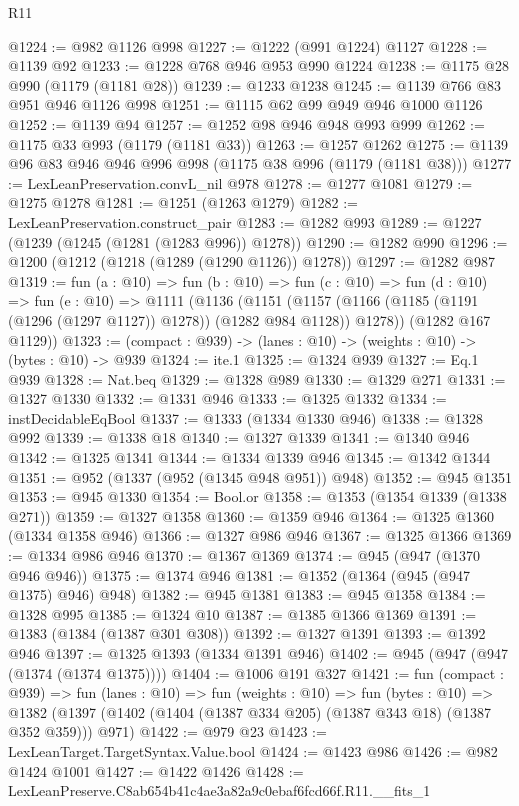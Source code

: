 \begin{lexlean}{R11}
\begin{coremodule}
@1224 := @982 @1126 @998
@1227 := @1222 (@991 @1224) @1127
@1228 := @1139 @92
@1233 := @1228 @768 @946 @953 @990 @1224
@1238 := @1175 @28 @990 (@1179 (@1181 @28))
@1239 := @1233 @1238
@1245 := @1139 @766 @83 @951 @946 @1126 @998
@1251 := @1115 @62 @99 @949 @946 @1000 @1126
@1252 := @1139 @94
@1257 := @1252 @98 @946 @948 @993 @999
@1262 := @1175 @33 @993 (@1179 (@1181 @33))
@1263 := @1257 @1262
@1275 := @1139 @96 @83 @946 @946 @996 @998 (@1175 @38 @996 (@1179 (@1181 @38)))
@1277 := LexLeanPreservation.convL_nil @978
@1278 := @1277 @1081
@1279 := @1275 @1278
@1281 := @1251 (@1263 @1279)
@1282 := LexLeanPreservation.construct_pair
@1283 := @1282 @993
@1289 := @1227 (@1239 (@1245 (@1281 (@1283 @996)) @1278))
@1290 := @1282 @990
@1296 := @1200 (@1212 (@1218 (@1289 (@1290 @1126)) @1278))
@1297 := @1282 @987
@1319 := fun (a : @10) =>
  fun (b : @10) =>
  fun (c : @10) =>
  fun (d : @10) =>
  fun (e : @10) =>
  @1111
    (@1136
      (@1151 (@1157 (@1166 (@1185 (@1191 (@1296 (@1297 @1127)) @1278)) (@1282 @984 @1128)) @1278))
      (@1282 @167 @1129))
@1323 := (compact : @939) -> (lanes : @10) -> (weights : @10) -> (bytes : @10) -> @939
@1324 := ite.{1}
@1325 := @1324 @939
@1327 := Eq.{1} @939
@1328 := Nat.beq
@1329 := @1328 @989
@1330 := @1329 @271
@1331 := @1327 @1330
@1332 := @1331 @946
@1333 := @1325 @1332
@1334 := instDecidableEqBool
@1337 := @1333 (@1334 @1330 @946)
@1338 := @1328 @992
@1339 := @1338 @18
@1340 := @1327 @1339
@1341 := @1340 @946
@1342 := @1325 @1341
@1344 := @1334 @1339 @946
@1345 := @1342 @1344
@1351 := @952 (@1337 (@952 (@1345 @948 @951)) @948)
@1352 := @945 @1351
@1353 := @945 @1330
@1354 := Bool.or
@1358 := @1353 (@1354 @1339 (@1338 @271))
@1359 := @1327 @1358
@1360 := @1359 @946
@1364 := @1325 @1360 (@1334 @1358 @946)
@1366 := @1327 @986 @946
@1367 := @1325 @1366
@1369 := @1334 @986 @946
@1370 := @1367 @1369
@1374 := @945 (@947 (@1370 @946 @946))
@1375 := @1374 @946
@1381 := @1352 (@1364 (@945 (@947 @1375) @946) @948)
@1382 := @945 @1381
@1383 := @945 @1358
@1384 := @1328 @995
@1385 := @1324 @10
@1387 := @1385 @1366 @1369
@1391 := @1383 (@1384 (@1387 @301 @308))
@1392 := @1327 @1391
@1393 := @1392 @946
@1397 := @1325 @1393 (@1334 @1391 @946)
@1402 := @945 (@947 (@947 (@1374 (@1374 @1375))))
@1404 := @1006 @191 @327
@1421 := fun (compact : @939) =>
  fun (lanes : @10) =>
  fun (weights : @10) =>
  fun (bytes : @10) =>
  @1382 (@1397 (@1402 (@1404 (@1387 @334 @205) (@1387 @343 @18) (@1387 @352 @359))) @971)
@1422 := @979 @23
@1423 := LexLeanTarget.TargetSyntax.Value.bool
@1424 := @1423 @986
@1426 := @982 @1424 @1001
@1427 := @1422 @1426
@1428 := LexLeanPreserve.C8ab654b41c4ae3a82a9c0ebaf6fcd66f.R11.__fits_1

\end{coremodule}
\end{lexlean}
